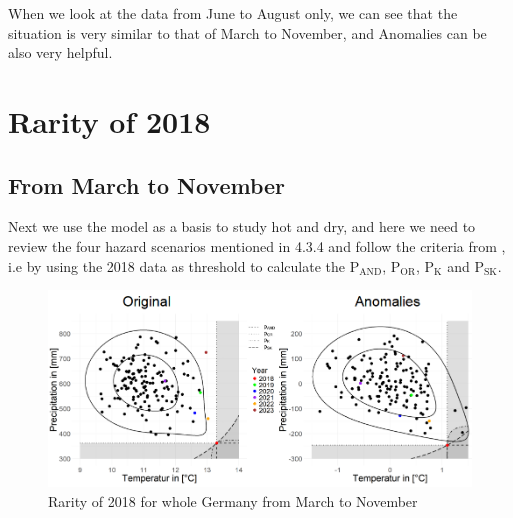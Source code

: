 \documentclass[
]{krantz}
\begin{document}
When we look at the data from June to August only, we can see that the situation is very similar to that of March to November, and Anomalies can be also very helpful.

\section{Rarity of 2018}\label{rarity-of-2018}

\subsection{From March to November}\label{from-march-to-november}

Next we use the model as a basis to study hot and dry, and here we need to review the four hazard scenarios mentioned in 4.3.4 and follow the criteria from \citet{zscheischler2020}, i.e by using the 2018 data as threshold to calculate the \(\text{P}_\text{AND}\), \(\text{P}_\text{OR}\), \(\text{P}_\text{K}\) and \(\text{P}_\text{SK}\).

\begin{figure}

{\centering \includegraphics[width=0.8\linewidth]{work/03-compounds/figures/RESULTS/resultallMtoN} 

}

\caption{Rarity of 2018 for whole Germany from March to November}\label{fig:result1-shiyu}
\end{figure}
\end{document}
